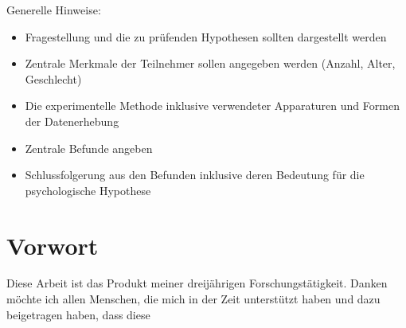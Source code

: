 \documentclass[11pt, twoside, a4paper]{book}		%
\begin{document}
\noindent Generelle Hinweise:
\begin{itemize}
	\item Fragestellung und die zu prüfenden Hypothesen sollten dargestellt werden
	\item Zentrale Merkmale der Teilnehmer sollen angegeben werden (Anzahl, Alter, Geschlecht)
	\item Die experimentelle Methode inklusive verwendeter Apparaturen und Formen der Datenerhebung
	\item Zentrale Befunde angeben
	\item Schlussfolgerung aus den Befunden inklusive deren Bedeutung für die psychologische Hypothese
\end{itemize}
\pagebreak

\renewcommand{\contentsname}{Inhalte}			%
\setcounter{tocdepth}{3}						%
\tableofcontents								%

\renewcommand\listfigurename{Abbildungen}		%
\listoffigures									%

\renewcommand\listtablename{Tabellen}			%
\listoftables 									%



\chapter*{Vorwort \label{cha:Vorwort}}
Diese Arbeit ist das Produkt meiner dreijährigen Forschungstätigkeit. Danken möchte ich 
allen Menschen, die mich in der Zeit unterstützt haben und dazu beigetragen haben, dass diese
\citep{Upper1974} 
\citep{Pahud2016}
\end{document}
